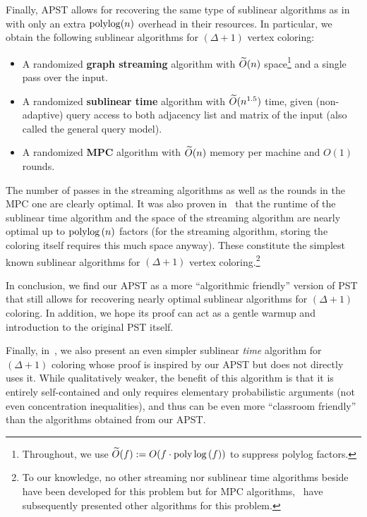 Finally, APST allows for recovering the same type of sublinear algorithms as in~\cite{AssadiCK19} with only an extra $\mbox{\rm poly}\!\log\!{(n)}$ overhead in their resources. 
In particular, we obtain the following sublinear algorithms for $(\Delta+1)$ vertex coloring: 
\begin{itemize}
	\item A randomized \textbf{graph streaming} algorithm with $\widetilde{O}(n)$ space\footnote{Throughout, we use $\widetilde{O}(f) := O(f \cdot \mbox{\rm poly}\log{(f)})$ to suppress polylog factors.} and a single pass over the input.  
	\item A randomized \textbf{sublinear time} algorithm with $\widetilde{O}(n^{1.5})$ time, given (non-adaptive) query access to both adjacency list and matrix of the input (also called the general query model). 
	\item A randomized \textbf{MPC} algorithm with $\widetilde{O}(n)$ memory per machine and $O(1)$ rounds. 
\end{itemize}
The number of passes in the streaming algorithms as well as the rounds in the MPC one are clearly optimal. It was also proven in~\cite{AssadiCK19} that 
the runtime of the sublinear time algorithm and the space of the streaming algorithm are nearly optimal up to $\mbox{\rm poly}\!\log{(n)}$ factors (for the streaming algorithm, storing the coloring itself requires this much space anyway). 
These constitute the simplest known sublinear algorithms for $(\Delta+1)$ vertex coloring.\footnote{To our knowledge, no other streaming nor sublinear time algorithms beside~\cite{AssadiCK19} have been developed for this problem but for MPC algorithms,~\cite{ChangFGUZ19,CzumajDP21} have subsequently presented other algorithms for this problem.} 

In conclusion, we find our APST as a more ``algorithmic friendly'' version of PST that still allows for recovering nearly optimal sublinear algorithms for $(\Delta+1)$ coloring. In addition, we hope its proof 
can act as a gentle warmup and introduction to the original PST itself. 

Finally, in~, we also present an even simpler sublinear \emph{time} algorithm for $(\Delta+1)$ coloring whose proof
is inspired by our APST but does not directly uses it. While qualitatively weaker, the benefit of this algorithm is that it is entirely self-contained and only requires elementary probabilistic arguments (not even concentration inequalities), and 
thus can be even more ``classroom friendly'' than the algorithms obtained from our APST. 

